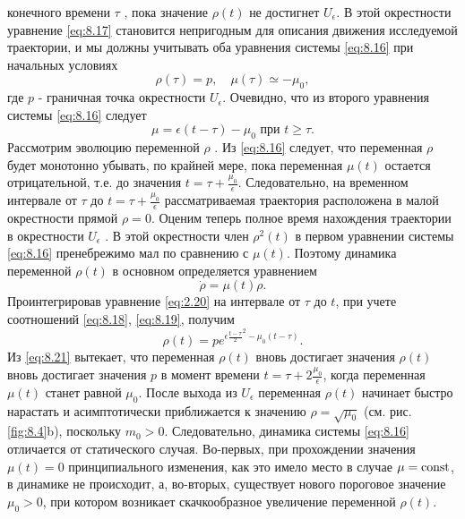 конечного времени $\tau$ , пока значение $\rho(t)$ не достигнет $U_{\epsilon}$.
В этой окрестности
уравнение \eqref{eq:8.17} становится непригодным для описания движения исследуемой
траектории, и мы должны учитывать оба уравнения системы \eqref{eq:8.16} при
начальных условиях
\begin{equation}
        \label{eq:8.18}
        \rho(\tau) = p,\quad \mu(\tau) \simeq -\mu_0,
\end{equation}
где $p$ - граничная точка окрестности $U_{\epsilon}$. Очевидно, что из второго уравнения
системы \eqref{eq:8.16} следует
\begin{equation}
        \label{eq:8.19}
        \mu = \epsilon(t-\tau) - \mu_0 \text{ при } t\geq\tau.
\end{equation}
Рассмотрим эволюцию переменной $\rho$ . Из \eqref{eq:8.16} следует, что переменная $\rho$
будет монотонно убывать, по крайней мере, пока переменная $\mu(t)$ остается
отрицательной, т.е. до значения $t = \tau + \frac{\mu_0}{\epsilon}$. 
Следовательно, на временном
интервале от $\tau$ до $t = \tau + \frac{\mu_0}{\epsilon}$
 рассматриваемая траектория расположена в
малой окрестности прямой $\rho=0$. Оценим теперь полное время нахождения
траектории в окрестности
$U_{\epsilon}$ . В этой окрестности член 
$\rho^2(t)$
 в первом
 уравнении системы \eqref{eq:8.16} пренебрежимо мал по сравнению с $\mu(t)$. Поэтому
 динамика переменной $\rho(t)$ в основном определяется уравнением
 \begin{equation}
         \label{eq:8.20}
         \dot \rho = \mu(t) \rho.
 \end{equation}
 Проинтегрировав уравнение \eqref{eq:2.20} на интервале от $\tau$ до $t$, при учете соотношений \eqref{eq:8.18}, \eqref{eq:8.19}, получим
 \begin{equation}
         \label{eq:8.21}
         \rho(t) = p e^{\epsilon\frac{t-\tau}{2}^2 - \mu_0 (t-\tau)}.
 \end{equation}
 Из \eqref{eq:8.21} вытекает, что переменная $\rho(t)$ вновь достигает значения $\rho(t)$ 
 вновь достигает значения $p$ в момент времени $t=\tau +2 \frac{\mu_0}{\epsilon}$, когда переменная
 $\mu(t)$ станет равной $\mu_0$. После выхода из $U_{\epsilon}$ 
 переменная $\rho(t)$ начинает быстро нарастать и асимптотически приближается к значению
 $\rho = \sqrt{ \mu_0}$ (см. рис.\ref{fig:8.4}b), поскольку $m_0>0$. Следовательно, динамика системы \eqref{eq:8.16} отличается от статического случая. Во-первых, при прохождении значения $\mu(t) = 0 $ принципиального изменения, как это имело место в случае $\mu=\textrm{const}$,
 в динамике не происходит, а, во-вторых, существует нового пороговое значение $\mu_0>0$, при котором возникает скачкообразное увеличение переменной $\rho(t).$


